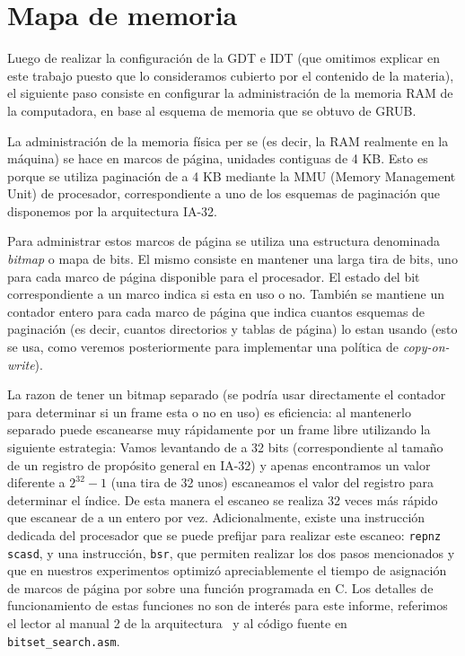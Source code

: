 \section{Mapa de memoria}
\label{sec::memory}

Luego de realizar la configuraci\'on de la GDT e IDT (que omitimos explicar en este trabajo
puesto que lo consideramos cubierto por el contenido de la materia), el siguiente paso
consiste en configurar la administraci\'on de la memoria RAM de la computadora, en base
al esquema de memoria que se obtuvo de GRUB.

La administraci\'on de la memoria f\'isica per se (es decir, la RAM realmente en la m\'aquina)
se hace en marcos de p\'agina, unidades contiguas de 4 KB. Esto es porque se utiliza paginaci\'on
de a 4 KB mediante la MMU (Memory Management Unit) de procesador, correspondiente a uno de los esquemas
de paginaci\'on que disponemos por la arquitectura IA-32.

Para administrar estos marcos de p\'agina se utiliza una estructura denominada \textit{bitmap} o mapa
de bits. El mismo consiste en mantener una larga tira de bits, uno para cada marco de p\'agina disponible
para el procesador. El estado del bit correspondiente a un marco indica si esta en uso o no. Tambi\'en
se mantiene un contador entero para cada marco de p\'agina que indica cuantos esquemas de paginaci\'on (es
decir, cuantos directorios y tablas de p\'agina) lo estan usando (esto se usa, como veremos posteriormente
para implementar una pol\'itica de \textit{copy-on-write}).

La razon de tener un bitmap separado (se podr\'ia usar directamente el contador para determinar si un frame
esta o no en uso) es eficiencia: al mantenerlo separado puede escanearse muy r\'apidamente por un
frame libre utilizando la siguiente estrategia: Vamos levantando de a 32 bits (correspondiente al tama\~no
de un registro de prop\'osito general en IA-32) y apenas encontramos un valor diferente a $2^{32} - 1$ (una
tira de 32 unos) escaneamos el valor del registro para determinar el \'indice. De esta manera el escaneo se
realiza 32 veces m\'as r\'apido que escanear de a un entero por vez. Adicionalmente, existe una instrucci\'on
dedicada del procesador que se puede prefijar para realizar este escaneo: \texttt{repnz scasd}, y una instrucci\'on,
\texttt{bsr}, que permiten realizar los dos pasos mencionados y que en nuestros experimentos optimiz\'o apreciablemente 
el tiempo de asignaci\'on de marcos de p\'agina por sobre una funci\'on programada en C. Los detalles de funcionamiento
de estas funciones no son de inter\'es para este informe, referimos el lector al manual 2 de la arquitectura~\cite{intel2}
y al c\'odigo fuente en \texttt{bitset\_search.asm}.

